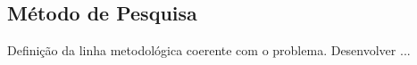 \subsection{Método de Pesquisa}
Definição da linha metodológica coerente com o problema.
Desenvolver ...
